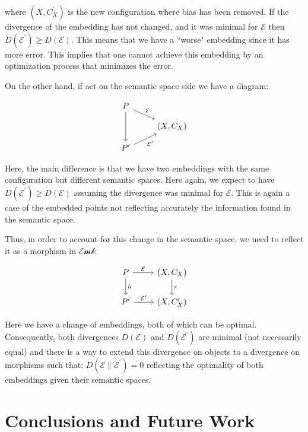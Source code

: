 \documentclass[10pt,a4paper]{elsarticle}
\newcommand{\E}{\mathcal{E}}
\newcommand{\Emb}{\mathcal{Emb}}
\begin{document}
where $(X, C^{\prime}_{X})$ is the new configuration where bias has been removed. If the divergence of the embedding has not changed, and it was minimal for $ \E $ then $ D(\E^{\prime})\geq D(\E)$. This means that we have a ``worse" embedding since it has more error. This implies that one cannot achieve this embedding by an optimization process that minimizes the error.

On the other hand, if act on the semantic space side we have a diagram:

\begin{equation}\label{diag:debiasprob}
	\begin{tikzcd}[row sep=small]
		P\arrow[dd]\arrow[dr, "\mathcal{E}"]& \\
		& (X,C_{X})\\ 
		P^{\prime}\arrow{ur}[swap]{\mathcal{E^{\prime}}}& 
	\end{tikzcd}
\end{equation}

Here, the main difference is that we have two embeddings with the same configuration but different semantic spaces. Here again, we expect to have $ D(\E^{\prime}) \geq D(\E) $ assuming the divergence was minimal for $ \E $. This is again a case of the embedded points not reflecting accurately the information found in the semantic space.

Thus, in order to account for this change in the semantic space, we need to reflect it as a morphism in $ \Emb $: 


\begin{equation}\label{diag:completedebias}
	\begin{tikzcd}
		P \arrow[d,"h"] \arrow[r,"\E"]& (X,C_{X})\arrow[d,"r"] \\
		P'\arrow[r,"\E^{\prime}"] & (X,C'_{X})
	\end{tikzcd}
\end{equation}

Here we have a change of embeddings, both of which can be optimal. Consequently, both divergences $ D(\E) $ and $D(\E^{\prime})$ are minimal (not necessarily equal) and there is a way to extend this divergence on objects to a divergence on morphisms such that: $ D(\E\|\E^{\prime})=0 $ reflecting the optimality of both embeddings given their semantic spaces.

\section{Conclusions and Future Work}\label{sec:CFW}
\end{document}
